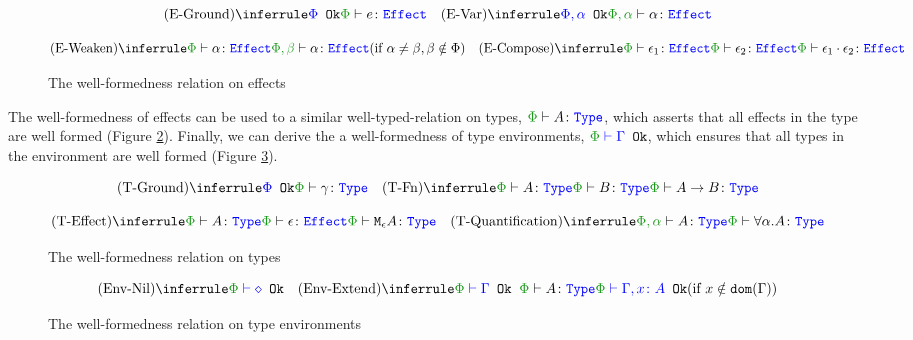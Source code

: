 \documentclass{Report}
\begin{document}
\begin{figure}[H]
    \centering
    \begin{framed}
        \[
    \ntreeruleI{\eground}{\ok{\P}}{\wellformedeffect{\P}{e}}
    \quad
    \ntreeruleI{\evar}{\ok{\P,\a}}{\wellformedeffect{\P,\a}{\a}}
    \] 
    
    \[
    \condtreeruleI{\eweaken}{\wellformedeffect{\P}{\a}}{\wellformedeffect{\P,\b}{\a}}{\a\neq\b, \b\notin\P}
    \quad
    \ntreeruleII{\ecompose}{\wellformedeffect{\P}{\e_1}}{\wellformedeffect{\P}{\e_2}}{\wellformedeffect{\P}{\e_1\dot\e_2}}
\]
    \end{framed}
    
    \caption{The well-formedness relation on effects}
    \label{EffectWellformednes}
\end{figure}



The well-formedness of effects can be used to a similar well-typed-relation on types, $\wellformedtype{\P}{A}$, which asserts that all effects in the type are well formed (Figure \ref{TypeWellformedness}). 
Finally, we can derive the a well-formedness of type environments,   $\oke{\P}{\G}$, which ensures that all types in the environment are well formed (Figure \ref{TypeEnvWellformedness}).

\begin{figure}[H]
    \centering
    \begin{framed}
        
\[
    \ntreeruleI{\tground}{\ok{\P}}{\wellformedtype{\P}{\g}}
    \quad
    \ntreeruleII{\tfun}{\wellformedtype{\P}{A}}{\wellformedtype{\P}{B}}{\wellformedtype{\P}{\ab}}
\] 

\[
    \ntreeruleII{\teffect}{\wellformedtype{\P}{A}}{\wellformedeffect{\P}{\e}}{\wellformedtype{\P}{\mea}}
    \quad
    \ntreeruleI{\tquant}{\wellformedtype{\P,\a}{A}}{\wellformedtype{\P}{\all{\a}{A}}}
\]
    \end{framed}    
    \caption{The well-formedness relation on types}
    \label{TypeWellformedness}
\end{figure}

\begin{figure}[H]
    \centering
\begin{framed}
    \[
        \ntreerulez{\envnil}{\oke{\P}{\nil}}
        \quad
        \condtreeruleI{\envextend}{\oke{\P}{\G}\s\s \wellformedtype{\P}{A}}{\oke{\P}{\gax}}{x\notin\dom{\G}}
    \]    
\end{framed}
    \caption{The well-formedness relation on type environments}
    \label{TypeEnvWellformedness}
\end{figure}
\end{document}
